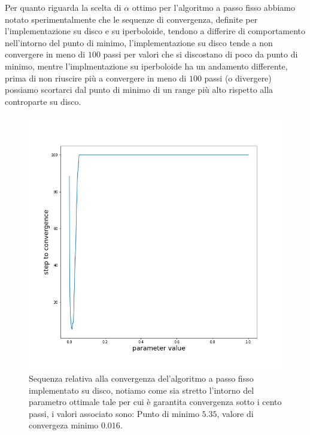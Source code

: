 \documentclass[a4paper, 12pt]{article}
\begin{document}
Per quanto riguarda la scelta di $\alpha$ ottimo per l'algoritmo a passo fisso abbiamo notato sperimentalmente che le sequenze di convergenza, definite per l'implementazione su disco e su iperboloide, tendono a differire di comportamento nell'intorno del punto di minimo, l'implementazione su disco tende a non convergere in meno di $100$ passi per valori che si discostano di poco da punto di minimo, mentre l'implmentazione su iperboloide ha un andamento differente, prima di non riuscire più a convergere in meno di $100$ passi (o divergere) possiamo scortarci dal punto di minimo di un range più alto rispetto alla controparte su disco.\\
\begin{figure}[t] %
    \centering\includegraphics[width=1\textwidth]{fixed_step_parameter_poincare.png}
    \caption{Sequenza relativa alla convergenza del'algoritmo a passo fisso implementato su disco, notiamo come sia stretto l'intorno del parametro ottimale tale per cui è garantita convergenza sotto i cento passi, i valori associato sono: Punto di minimo $5.35$, valore di convergeza minimo $0.016$.}
\end{figure}
\end{document}
